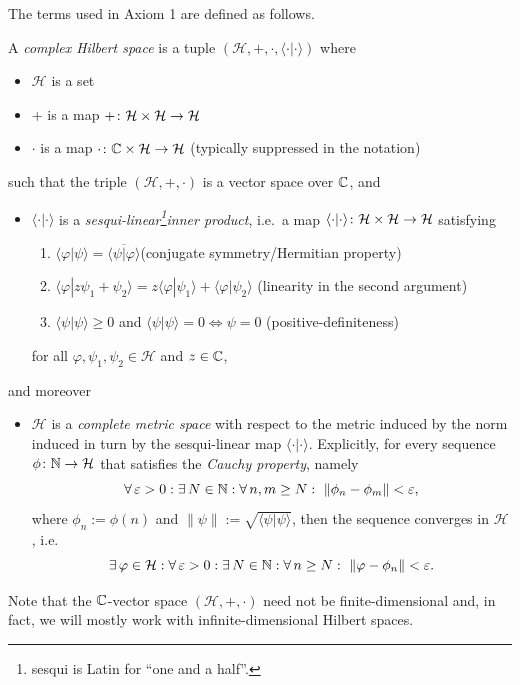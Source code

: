 The terms used in Axiom 1 are defined as follows.

\begin{definition}
A \emph{complex Hilbert space} is a tuple $(\mathcal{H},+,\cdot,\langle \cdot | \cdot \rangle)$ where
\begin{itemize}
\item $\mathcal{H}$ is a set
\item $+$ is a map $+\colon\mathcal{H}\times \mathcal{H}\to \mathcal{H}$
\item $\cdot$ is a map $\cdot \colon \mathbb{C} \times \mathcal{H}\to \mathcal{H}$ (typically suppressed in the notation)
\end{itemize}
such that the triple $(\mathcal{H},+,\cdot)$ is a vector space over $\mathbb{C}$, and
\begin{itemize}
\item $\langle \cdot | \cdot \rangle$ is a \emph{sesqui-linear\footnote{sesqui is Latin for ``one and a half''.}inner product}, i.e.\ a map $\langle \cdot | \cdot \rangle\colon\mathcal{H}\times \mathcal{H}\to \mathcal{H}$ satisfying
\begin{enumerate}[label=(\roman*)]
\item $\langle \varphi|\psi\rangle=\overline{\langle \psi|\varphi\rangle}$\hfill (conjugate symmetry/Hermitian property)
\item $\langle \varphi|z\psi_1+\psi_2\rangle=z\langle \varphi|\psi_1\rangle+\langle \varphi|\psi_2\rangle$ \hfill (linearity in the second argument)
\item $\langle \psi | \psi\rangle \geq 0$ and $\langle \psi|\psi\rangle = 0 \Leftrightarrow \psi = 0$ \hfill (positive-definiteness)
\end{enumerate}
for all $\varphi,\psi_1,\psi_2\in\mathcal{H}$ and $z\in \mathbb{C}$,
\end{itemize}
and moreover
\begin{itemize}
\item $\mathcal{H}$ is a \emph{complete metric space} with respect to the metric induced by the norm induced in turn by the sesqui-linear map $\langle \cdot | \cdot \rangle$. Explicitly, for every sequence $\phi\colon \mathbb{N} \to \mathcal{H}$ that satisfies the \emph{Cauchy property}, namely
\begin{equation*}
\forall \, \varepsilon > 0 : \exists \, N\in \mathbb{N} : \forall \, n,m \geq N : \ \|\phi_n-\phi_m\|< \varepsilon,
\end{equation*}
where $\phi_n:=\phi(n)$ and $\|\psi\|:=\sqrt{\langle \psi | \psi \rangle}$, then the sequence converges in $\mathcal{H}$, i.e.\
\begin{equation*}
\exists \, \varphi\in\mathcal{H}:\forall \, \varepsilon > 0 : \exists \, N\in \mathbb{N} : \forall \, n \geq N : \ \|\varphi-\phi_n\|< \varepsilon.
\end{equation*}
\end{itemize}
\end{definition}
Note that the $\mathbb{C}$-vector space $(\mathcal{H},+,\cdot)$ need not be finite-dimensional and, in fact, we will mostly work with infinite-dimensional Hilbert spaces. 


